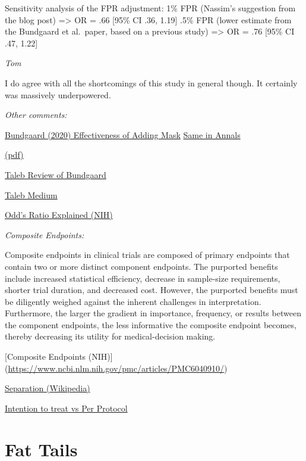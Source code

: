 \documentclass[
]{book}
\begin{document}
Sensitivity analysis of the FPR adjustment:
1\% FPR (Nassim's suggestion from the blog post) =\textgreater{} OR = .66 {[}95\% CI .36, 1.19{]}
.5\% FPR (lower estimate from the Bundgaard et al.~paper, based on a previous study) =\textgreater{} OR = .76 {[}95\% CI .47, 1.22{]}

\emph{Tom}

I do agree with all the shortcomings of this study in general though. It certainly was massively underpowered.

\emph{Other comments:}

\href{https://pubmed.ncbi.nlm.nih.gov/33205991/}{Bundgaard (2020) Effectiveness of Adding Mask}
\href{https://www.acpjournals.org/doi/10.7326/M20-6817}{Same in Annals}

\href{pdf/Bundgaard_2020_Mask_Effectiveness_ref_Taleb.pdf}{(pdf)}

\href{https://fooledbyrandomnessdotcom.wordpress.com/2020/11/25/hypothesis-testing-in-the-presence-of-false-positives-the-flaws-in-the-danish-mask-study/}{Taleb Review of Bundgaard}

\href{https://medium.com/incerto/the-masks-masquerade-7de897b517b7}{Taleb Medium}

\href{https://www.ncbi.nlm.nih.gov/pmc/articles/PMC2938757/}{Odd's Ratio Explained (NIH)}

\emph{Composite Endpoints:}

Composite endpoints in clinical trials are composed of primary endpoints that contain two or more distinct component endpoints. The purported benefits include increased statistical efficiency, decrease in sample-size requirements, shorter trial duration, and decreased cost. However, the purported benefits must be diligently weighed against the inherent challenges in interpretation. Furthermore, the larger the gradient in importance, frequency, or results between the component endpoints, the less informative the composite endpoint becomes, thereby decreasing its utility for medical-decision making.

{[}Composite Endpoints (NIH){]} (\url{https://www.ncbi.nlm.nih.gov/pmc/articles/PMC6040910/})

\href{https://en.wikipedia.org/wiki/Separation_(statistics)}{Separation (Wikipedia)}

\href{https://www.ncbi.nlm.nih.gov/pmc/articles/PMC5654877/}{Intention to treat vs Per Protocol}

\hypertarget{fat-tails}{%
\chapter{Fat Tails}\label{fat-tails}}
\end{document}
